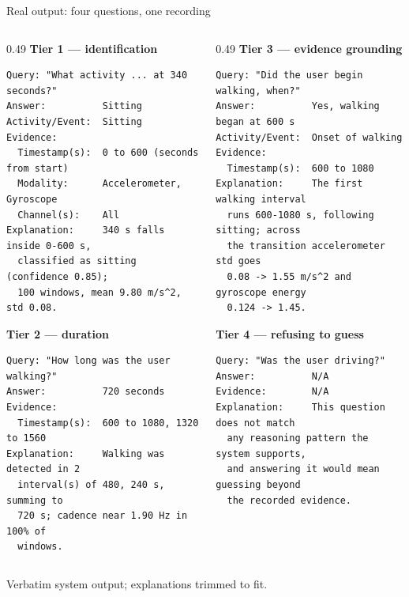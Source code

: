 \documentclass[aspectratio=169,11pt]{beamer}
\begin{document}
\begin{frame}[fragile]{Real output: four questions, one recording}
  \scriptsize
  \begin{columns}[T,onlytextwidth]
    \begin{column}{0.49\textwidth}
      \textcolor{atsblue}{\textbf{Tier 1 --- identification}}
\begin{verbatim}
Query: "What activity ... at 340 seconds?"
Answer:          Sitting
Activity/Event:  Sitting
Evidence:
  Timestamp(s):  0 to 600 (seconds from start)
  Modality:      Accelerometer, Gyroscope
  Channel(s):    All
Explanation:     340 s falls inside 0-600 s,
  classified as sitting (confidence 0.85);
  100 windows, mean 9.80 m/s^2, std 0.08.
\end{verbatim}
      \medskip
      \textcolor{atsblue}{\textbf{Tier 2 --- duration}}
\begin{verbatim}
Query: "How long was the user walking?"
Answer:          720 seconds
Evidence:
  Timestamp(s):  600 to 1080, 1320 to 1560
Explanation:     Walking was detected in 2
  interval(s) of 480, 240 s, summing to
  720 s; cadence near 1.90 Hz in 100% of
  windows.
\end{verbatim}
    \end{column}
    \begin{column}{0.49\textwidth}
      \textcolor{atsblue}{\textbf{Tier 3 --- evidence grounding}}
\begin{verbatim}
Query: "Did the user begin walking, when?"
Answer:          Yes, walking began at 600 s
Activity/Event:  Onset of walking
Evidence:
  Timestamp(s):  600 to 1080
Explanation:     The first walking interval
  runs 600-1080 s, following sitting; across
  the transition accelerometer std goes
  0.08 -> 1.55 m/s^2 and gyroscope energy
  0.124 -> 1.45.
\end{verbatim}
      \medskip
      \textcolor{atsorange}{\textbf{Tier 4 --- refusing to guess}}
\begin{verbatim}
Query: "Was the user driving?"
Answer:          N/A
Evidence:        N/A
Explanation:     This question does not match
  any reasoning pattern the system supports,
  and answering it would mean guessing beyond
  the recorded evidence.
\end{verbatim}
    \end{column}
  \end{columns}
  \centering\tiny
  Verbatim system output; explanations trimmed to fit.
\end{frame}
\end{document}
